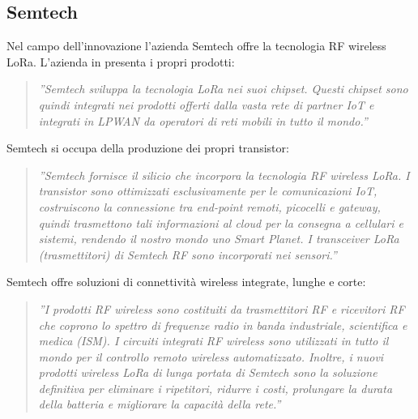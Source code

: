 \documentclass[a4paper]{report} %
\begin{document}
\subsection{Semtech}
Nel campo dell'innovazione l'azienda Semtech offre la tecnologia RF wireless LoRa. L'azienda in \cite{art:rif.24} presenta i propri prodotti: 
\begin{quote}
	\textit{''Semtech sviluppa la tecnologia LoRa nei suoi chipset. Questi chipset sono quindi integrati nei prodotti offerti dalla vasta rete di partner IoT e integrati in LPWAN da operatori di reti mobili in tutto il mondo.''}
\end{quote}
Semtech si occupa della produzione dei propri transistor: 
\begin{quote}
	\textit{''Semtech fornisce il silicio che incorpora la tecnologia RF wireless LoRa. I transistor sono ottimizzati esclusivamente per le comunicazioni IoT, costruiscono la connessione tra end-point remoti, picocelli e gateway, quindi trasmettono tali informazioni al cloud per la consegna a cellulari e sistemi, rendendo il nostro mondo uno Smart Planet. I transceiver LoRa (trasmettitori) di Semtech RF sono incorporati nei sensori.''}
\end{quote}
Semtech offre soluzioni di connettività wireless integrate, lunghe e corte: 
\begin{quote}
	\textit{''I prodotti RF wireless sono costituiti da  trasmettitori RF e ricevitori RF che coprono lo spettro di frequenze radio in banda industriale, scientifica e medica (ISM). I circuiti integrati RF wireless sono utilizzati in tutto il mondo per il controllo remoto wireless automatizzato. Inoltre, i nuovi prodotti wireless LoRa di lunga portata di Semtech sono la soluzione definitiva per eliminare i ripetitori, ridurre i costi, prolungare la durata della batteria e migliorare la capacità della rete.''}
\end{quote}
\end{document}
